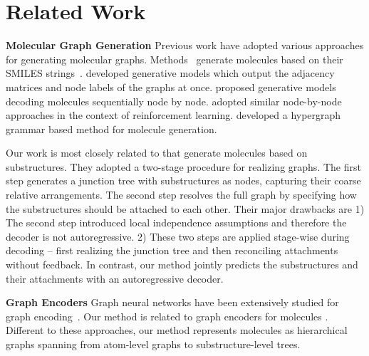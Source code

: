 \documentclass{article} \usepackage{iclr2020_conference,times}
\begin{document}
 \section{Related Work}
\textbf{Molecular Graph Generation }
Previous work have adopted various approaches for generating molecular graphs.
Methods~\citep{gomez2016automatic,segler2017generating,kusner2017grammar,dai2018syntax-directed,guimaraes2017objective,olivecrona2017molecular,popova2018deep,kang2018conditional} generate molecules based on their SMILES strings~\citep{weininger1988smiles}.
\citet{simonovsky2018graphvae,de2018molgan,ma2018constrained} developed generative models which output the adjacency matrices and node labels of the graphs at once. 
\citet{you2018graphrnn,li2018learning,samanta2018nevae,liu2018constrained} proposed generative models decoding molecules sequentially node by node.  
\citet{you2018graph,zhou2018optimization} adopted similar node-by-node approaches in the context of reinforcement learning. 
\citet{kajino2018molecular} developed a hypergraph grammar based method for molecule generation. 

Our work is most closely related to \citet{jin2018junction,jin2018learning} that generate molecules based on substructures. They adopted a two-stage procedure for realizing graphs. The first step generates a junction tree with substructures as nodes, capturing their coarse relative arrangements. The second step resolves the full graph by specifying how the substructures should be attached to each other.
Their major drawbacks are 
1) The second step introduced local independence assumptions and therefore the decoder is not autoregressive.
2) These two steps are applied stage-wise during decoding -- first realizing the junction tree and then reconciling attachments without feedback. 
In contrast, our method jointly predicts the substructures and their attachments with an autoregressive decoder.

\textbf{Graph Encoders } Graph neural networks have been extensively studied for graph encoding~\citep{scarselli2009graph,bruna2013spectral,li2015gated,niepert2016learning,kipf2016semi,hamilton2017inductive,lei2017deriving,velickovic2017graph,xu2018powerful}.
Our method is related to graph encoders for molecules \citep{duvenaud2015convolutional,kearnes2016molecular,dai2016discriminative,gilmer2017neural,schutt2017schnet}. Different to these approaches, our method represents molecules as hierarchical graphs spanning from atom-level graphs to substructure-level trees. 
\end{document}
